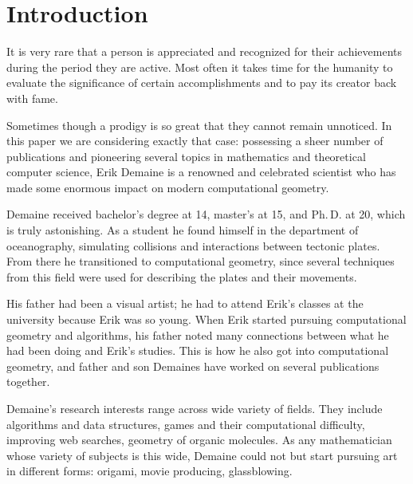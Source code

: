\documentclass[a4paper,12pt]{article}
\begin{document}
\restoregeometry

\newpage \maketitle \vspace{1cm}

\tableofcontents \vfill \eject

\section{Introduction}

It is very rare that a person is appreciated and recognized for their achievements during the period they are active. Most often it takes time for the humanity to evaluate the significance of certain accomplishments and to pay its creator back with fame.

Sometimes though a prodigy is so great that they cannot remain unnoticed. In this paper we are considering exactly that case: possessing a sheer number of publications and pioneering several topics in mathematics and theoretical computer science, Erik Demaine is a renowned and celebrated scientist who has made some enormous impact on modern computational geometry.

Demaine received bachelor's degree at 14, master's at 15, and Ph.\,D. at 20, which is truly astonishing. As a student he found himself in the department of oceanography, simulating collisions and interactions between tectonic plates. From there he transitioned to computational geometry, since several techniques from this field were used for describing the plates and their movements.

His father had been a visual artist; he had to attend Erik's classes at the university because Erik was so young. When Erik started pursuing computational geometry and algorithms, his father noted many connections between what he had been doing and Erik's studies. This is how he also got into computational geometry, and father and son Demaines have worked on several publications together.

Demaine's research interests range across wide variety of fields. They include algorithms and data structures, games and their computational difficulty, improving web searches, geometry of organic molecules. As any mathematician whose variety of subjects is this wide, Demaine could not but start pursuing art in different forms: origami, movie producing, glassblowing.
\end{document}
